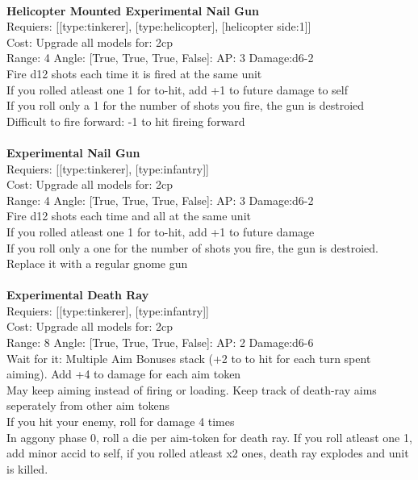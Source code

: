\ \\
{\bf Helicopter Mounted Experimental Nail Gun } \\

Requiers: [[type:tinkerer], [type:helicopter], [helicopter side:1]] \\
Cost: Upgrade all models for: 2cp \\


Range: 4  Angle: [True, True, True, False]: AP: 3 Damage:d6-2 \\
Fire d12 shots each time it is fired at the same unit\\ 
If you rolled atleast one 1 for to-hit, add +1 to future damage to self\\ 
If you roll only a 1 for the number of shots you fire, the gun is destroied\\ 
Difficult to fire forward: -1 to hit fireing forward\\ 








\ \\
{\bf Experimental Nail Gun } \\

Requiers: [[type:tinkerer], [type:infantry]] \\
Cost: Upgrade all models for: 2cp \\


Range: 4  Angle: [True, True, True, False]: AP: 3 Damage:d6-2 \\
Fire d12 shots each time and all at the same unit\\ 
If you rolled atleast one 1 for to-hit, add +1 to future damage\\ 
If you roll only a one for the number of shots you fire, the gun is destroied. Replace it with a regular gnome gun\\ 








\ \\
{\bf Experimental Death Ray } \\

Requiers: [[type:tinkerer], [type:infantry]] \\
Cost: Upgrade all models for: 2cp \\


Range: 8  Angle: [True, True, True, False]: AP: 2 Damage:d6-6 \\
Wait for it: Multiple Aim Bonuses stack (+2 to to hit for each turn spent aiming). Add +4 to damage for each aim token\\ 
May keep aiming instead of firing or loading. Keep track of death-ray aims seperately from other aim tokens\\ 
If you hit your enemy, roll for damage 4 times\\ 
In aggony phase 0, roll a die per aim-token for death ray. If you roll atleast one 1, add minor accid to self, if you rolled atleast x2 ones, death ray explodes and unit is killed.\\ 








